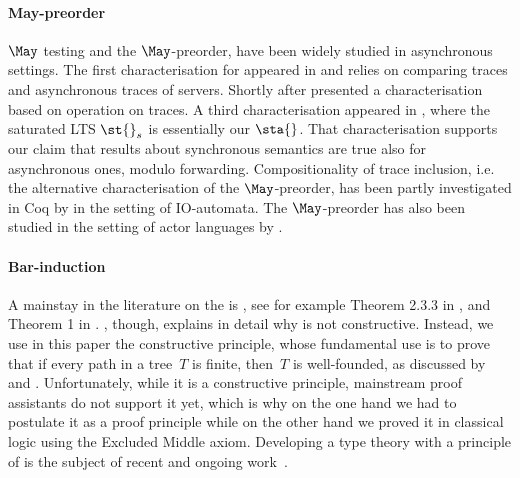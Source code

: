 \paragraph{May-preorder} %
  $\May$ testing and the $\May$-preorder, have been widely studied in 
  asynchronous settings. The first characterisation for \ACCS appeared 
  in \cite{DBLP:conf/fsttcs/CastellaniH98} and relies on comparing traces
  and asynchronous traces of servers. Shortly after
  \cite{DBLP:journals/iandc/BorealeNP02} presented a characterisation based
  on operation on traces.
  A third characterisation appeared in \cite{DBLP:conf/birthday/BaldanBGV15},
  where the saturated LTS $\st{}_s$ is essentially our $\sta{}$.
  That characterisation supports our claim that results about synchronous
  semantics are true also for asynchronous ones, modulo forwarding.
  Compositionality of trace inclusion, i.e. the alternative
  characterisation of the $\May$-preorder, 
  has been partly investigated in Coq by \cite{aathalye-meng} in the
  setting of IO-automata.
  The $\May$-preorder has also been studied in the setting of actor languages
  by \cite{caruana19,Tanti2015TowardsSR}.




\paragraph{Bar-induction}
A mainstay in the literature on the \mustpreorder is \koenigslemma, see
for example Theorem 2.3.3 in \cite{TCD-CS-2010-13}, and Theorem 1 in
\cite{DBLP:journals/scp/BernardiF18}. \cite{dummett2000elements}, though,
explains in detail why \koenigslemma is not constructive.
%
Instead, we use in this paper the constructive \barinduction principle, whose
fundamental use is to prove that if every path in a tree~$T$ is finite, then~$T$
is well-founded, as discussed by
\cite{DBLP:conf/aplas/NakataUB11,DBLP:conf/lics/BredeH21} and
\cite{kleene1965foundations}.
%
Unfortunately, while it is a constructive principle, mainstream proof
assistants do not support it yet, which is why on the one hand we had
to postulate it as a proof principle while on the other hand we proved
it in classical logic using the Excluded Middle axiom. %
%
Developing a type theory with a principle of \barinduction is the subject of
recent and ongoing work~\cite{DBLP:conf/types/Fridlender98,DBLP:journals/jacm/RahliBCC19}.


